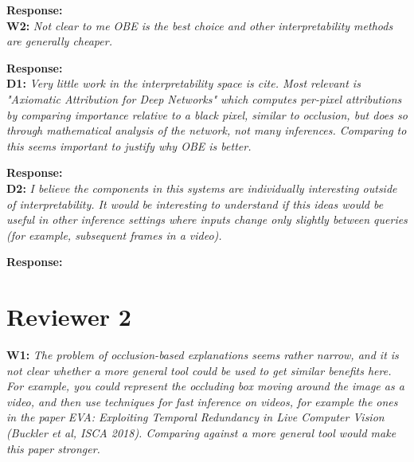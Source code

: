 \documentclass[preprint]{vldb}
\begin{document}
\vspace{2mm}
\noindent \textbf{Response:}\\

\vspace{2mm}
\noindent \textbf{W2:} \textit{Not clear to me OBE is the best choice and other interpretability methods are generally cheaper.}

\vspace{2mm}
\noindent \textbf{Response:} \\

\vspace{2mm}
\noindent \textbf{D1:} \textit{Very little work in the interpretability space is cite. Most relevant is "Axiomatic Attribution for Deep Networks" which computes per-pixel attributions by comparing importance relative to a black pixel, similar to occlusion, but does so through mathematical analysis of the network, not many inferences. Comparing to this seems important to justify why OBE is better.}

\vspace{2mm}
\noindent \textbf{Response:} \\

\vspace{2mm}
\noindent \textbf{D2:} \textit{I believe the components in this systems are individually interesting outside of interpretability. It would be interesting to understand if this ideas would be useful in other inference settings where inputs change only slightly between queries (for example, subsequent frames in a video).}

\vspace{2mm}
\noindent \textbf{Response:} \\


\section{Reviewer 2}

\vspace{2mm}
\noindent \textbf{W1:} \textit{The problem of occlusion-based explanations seems rather narrow, and it is not clear whether a more general tool could be used to get similar benefits here. For example, you could represent the occluding box moving around the image as a video, and then use techniques for fast inference on videos, for example the ones in the paper EVA: Exploiting Temporal Redundancy in Live Computer Vision (Buckler et al, ISCA 2018). Comparing against a more general tool would make this paper stronger.}
\end{document}

